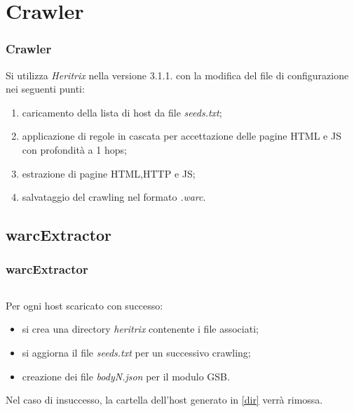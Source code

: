 \documentclass[aspectratio=169]{beamer}
\begin{document}
\section{Crawler}
\begin{frame}
	\frametitle{Crawler}
Si utilizza \textit{Heritrix} nella versione 3.1.1. con la modifica del file di configurazione nei seguenti punti:
\begin{enumerate}
\item caricamento della lista di host da file \textit{seeds.txt};
\item applicazione di regole in cascata per accettazione delle pagine \textsc{HTML} e \textsc{JS} con profondità a 1 \textsf{hops};
\item estrazione di pagine HTML,HTTP e JS;
\item salvataggio del crawling nel formato \textit{.warc}.
\end{enumerate}
\end{frame}

\subsection{warcExtractor}
\begin{frame}
\frametitle{warcExtractor}
	\begin{columns}
		\begin{column}{0.5\textwidth}
		Per ogni host scaricato con successo:
		\begin{itemize}
		\item si crea una directory \textit{heritrix} contenente i file associati;
		\item si aggiorna il file \textit{seeds.txt} per un successivo crawling;
		\item creazione dei file \textit{bodyN.json} per il modulo GSB.
		\end{itemize}
		Nel caso di insuccesso, la cartella dell'host generato in \ref{dir} verrà rimossa.
		\end{column}
		\begin{column}{0.4\textwidth}
		\end{column}
	\end{columns}
\end{frame}
\end{document}
